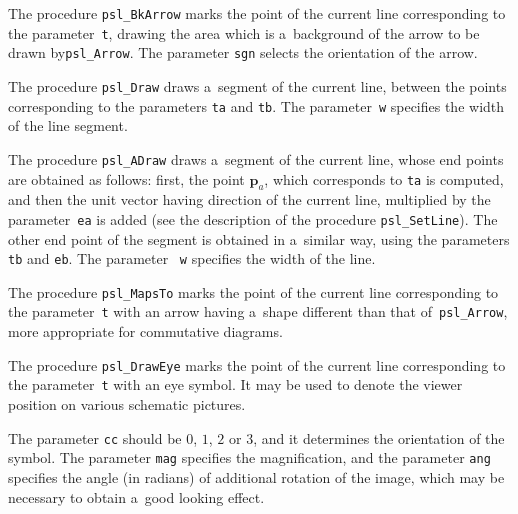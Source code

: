 \vspace{\bigskipamount}
The procedure \texttt{psl\_BkArrow} marks the point of the current line
corresponding to the parameter~\texttt{t}, drawing the area which is
a~background of the arrow to be drawn by\texttt{psl\_Arrow}.
The parameter \texttt{sgn} selects the orientation of the arrow.

\newpage
The procedure \texttt{psl\_Draw} draws a~segment of the current line,
between the points corresponding to the parameters
\texttt{ta} and \texttt{tb}. The parameter~\texttt{w} specifies the
width of the line segment.

\vspace{\bigskipamount}
The procedure \texttt{psl\_ADraw} draws a~segment of the current line,
whose end points are obtained as follows: first, the point
$\bm{p}_a$, which corresponds to \texttt{ta} is computed, and then
the unit vector having direction of the current line, multiplied by
the parameter~\texttt{ea} is added (see the description of the procedure
\texttt{psl\_SetLine}). The other end point of the segment is obtained in
a~similar way, using the parameters \texttt{tb} and \texttt{eb}.
The parameter ~\texttt{w} specifies the width of the line.

\vspace{\bigskipamount}
The procedure \texttt{psl\_MapsTo} marks the point of the current line
corresponding to the parameter~\texttt{t} with an arrow having a~shape
different than that of~\texttt{psl\_Arrow}, more appropriate
for commutative diagrams.

\vspace{\bigskipamount}
The procedure \texttt{psl\_DrawEye} marks the point of the current line
corresponding to the parameter~\texttt{t} with an eye symbol.
It may be used to denote the viewer position on various schematic pictures.

The parameter \texttt{cc} should be $0$, $1$, $2$ or $3$, and it determines
the orientation of the symbol. The parameter \texttt{mag}
specifies the magnification, and the parameter \texttt{ang} specifies the
angle (in radians) of additional rotation of the image, which may be necessary
to obtain a~good looking effect.


